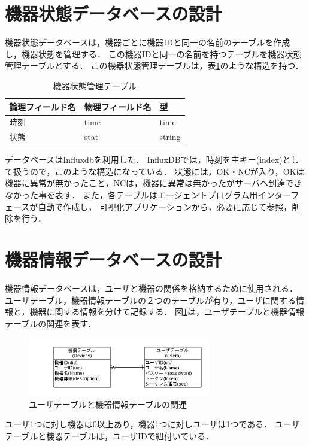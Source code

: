 \section{機器状態データベースの設計}
機器状態データベースは，機器ごとに機器IDと同一の名前のテーブルを作成し，機器状態を管理する．
この機器IDと同一の名前を持つテーブルを機器状態管理テーブルとする．
この機器状態管理テーブルは，表\ref{tab:devstat}のような構造を持つ．
\begin{table}[htb]
\begin{center}
\caption{機器状態管理テーブル}
\label{tab:devstat}
\begin{tabular}{|l|l|l|} \hline
論理フィールド名 & 物理フィールド名 & 型 \\ \hline \hline
時刻 & time & time \\ \hline
状態 & stat & string \\ \hline
\end{tabular}
\end{center}
\end{table}

データベースはInfluxdbを利用した．
InfluxDBでは，時刻を主キー(index)として扱うので，このような構造になっている．
状態には，OK・NCが入り，OKは機器に異常が無かったこと，NCは，機器に異常は無かったがサーバへ到達できなかった事を表す．
また，各テーブルはエージェントプログラム用インターフェースが自動で作成し，
可視化アプリケーションから，必要に応じて参照，削除を行う．

\section{機器情報データベースの設計}
機器情報データベースは，ユーザと機器の関係を格納するために使用される．
ユーザテーブル，機器情報テーブルの２つのテーブルが有り，ユーザに関する情報と，機器に関する情報を分けて記録する．
図\ref{fig:erdiagram}は，ユーザテーブルと機器情報テーブルの関連を表す．
\begin{figure}[htbp]
\begin{center}
\includegraphics[width=8cm]{images/ERdiagram.png}
\caption{ユーザテーブルと機器情報テーブルの関連}
\label{fig:erdiagram}
\end{center}
\end{figure}
ユーザ1つに対し機器は0以上あり，機器1つに対しユーザは1つである．
ユーザテーブルと機器テーブルは，ユーザIDで紐付いている．


